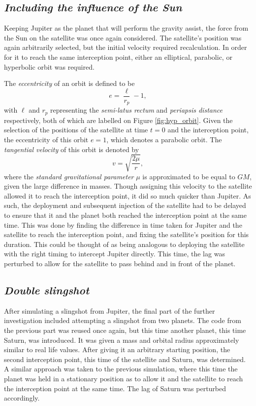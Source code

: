 \documentclass[11pt, english]{report}
\begin{document}
\subsection{\textsl{Including the influence of the Sun}}
\normalsize{\noindent Keeping Jupiter as the planet that will perform the gravity assist, the force from the Sun on the satellite was once again considered. The satellite's position was again arbitrarily selected, but the initial velocity required recalculation. In order for it to reach the same interception point, either an elliptical, parabolic, or hyperbolic orbit was required.

The \emph{eccentricity} of an orbit \cite{kluever_spaceflight_2003} is defined to be
\begin{equation}
    e = \frac{\ell}{r_p} - 1,
\end{equation}
\noindent with $\ell$ and $r_p$ representing the \emph{semi-latus rectum} and \emph{periapsis distance} respectively, both of which are labelled on Figure \ref{fig:hyp_orbit}. Given the selection of the positions of the satellite at time $t=0$ and the interception point, the eccentricity of this orbit $e=1$, which denotes a parabolic orbit. The \emph{tangential velocity} of this orbit is denoted by 
\begin{equation}
    v = \sqrt{\frac{2\mu}{r}},
\end{equation}
\noindent where the \emph{standard gravitational parameter} $\mu$ is approximated to be equal to $GM$, given the large difference in masses. Though assigning this velocity to the satellite allowed it to reach the interception point, it did so much quicker than Jupiter. As such, the deployment and subsequent injection of the satellite had to be delayed to ensure that it and the planet both reached the interception point at the same time. This was done by finding the difference in time taken for Jupiter and the satellite to reach the interception point, and fixing the satellite's position for this duration. This could be thought of as being analogous to deploying the satellite with the right timing to intercept Jupiter directly. This time, the lag was perturbed to allow for the satellite to pass behind and in front of the planet.
}

\subsection{\textsl{Double slingshot}}
\normalsize{\noindent After simulating a slingshot from Jupiter, the final part of the further investigation included attempting a slingshot from two planets. The code from the previous part was reused once again, but this time another planet, this time Saturn, was introduced. It was given a mass and orbital radius approximately similar to real life values. After giving it an arbitrary starting position, the second interception point, this time of the satellite and Saturn, was determined. A similar approach was taken to the previous simulation, where this time the planet was held in a stationary position as to allow it and the satellite to reach the interception point at the same time. The lag of Saturn was perturbed accordingly.

}
\end{document}
